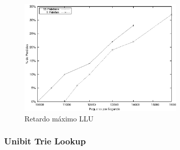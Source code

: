 \begin{figure}[!h]
  \centering
	\includegraphics[width=0.7\textwidth]{5-resultados/graf/llumax.eps}
  \caption{Retardo máximo LLU}
  \label{figmaxllu}
\end{figure}



\newpage
\subsubsection{Unibit Trie Lookup}

